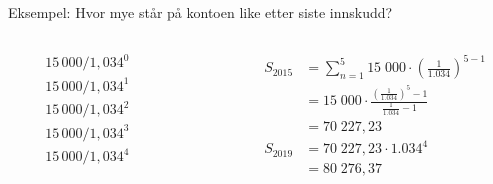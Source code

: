 \begin{frame}[t]{Eksempel: Hvor mye står på kontoen like etter siste innskudd?}
\begin{center}
\end{center}
\begin{columns}[T,onlytextwidth]
  \begin{column}{0.10\textwidth}
    \begin{align*}
      &15\,000 / 1,034^0\\
      &15\,000 / 1,034^1\\
      &15\,000 / 1,034^2\\
      &15\,000 / 1,034^3\\
      &15\,000 / 1,034^4
    \end{align*}
  \end{column}
  \begin{column}{0.30\textwidth}
  \end{column}
   \begin{column}{0.60\textwidth}
   \begin{align*}
     S_{2015}&=\sum_{n=1}^5 15\;000\cdot \left(\frac{1}{1.034}\right)^{5-1}\\
             &=15\;000\cdot \frac{\left(\frac{1}{1.034}\right)^5-1}{\frac{1}{1.034}-1}\\
             &=70\;227,23\\
     S_{2019}&=70\;227,23\cdot 1.034^4\\
             &=80\;276,37
   \end{align*}
\end{column}
\end{columns}
\end{frame}

